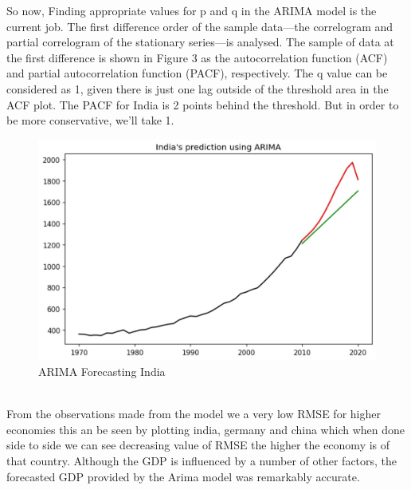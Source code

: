 \documentclass[conference]{IEEEtran}
\begin{document}
So now, Finding appropriate values for p and q in the ARIMA model is the current job. The first difference order of the sample data—the correlogram and partial correlogram of the stationary series—is analysed. The sample of data at the first difference is shown in Figure 3 as the autocorrelation function (ACF) and partial autocorrelation function (PACF), respectively.
The q value can be considered as 1, given there is just one lag outside of the threshold area in the ACF plot. The PACF for India is 2 points behind the threshold. But in order to be more conservative, we'll take 1.\\
\begin{figure}[htbp]
    \centerline{\includegraphics[scale=0.37]{arimaa2.jpg}}
    \caption{ARIMA Forecasting India}
\end{figure}
\\From the observations made from the model we a very low RMSE for higher economies this an be seen by plotting india, germany and china which when done side to side we can see decreasing
value of RMSE the higher the economy is of that country. Although the GDP is influenced by a number of other factors,
the forecasted GDP provided by the Arima model was remarkably accurate.
\bigskip
\end{document}
